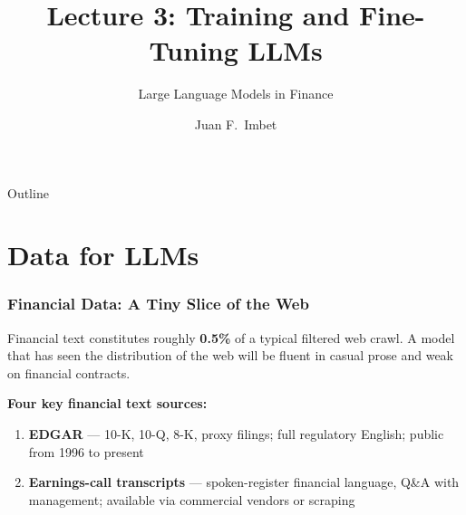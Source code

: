 \documentclass[9pt,t]{beamer}
\title{Lecture 3: Training and Fine-Tuning LLMs}
\subtitle{Large Language Models in Finance}
\author{Juan F.\ Imbet}
\institute{Paris Dauphine -- PSL University}
\date{}
\begin{document}
\begin{frame}
\frametitle{}
\titlepage
\end{frame}

\begin{frame}{Outline}\tableofcontents\end{frame}

\section{Data for LLMs}

\begin{frame}
\frametitle{Financial Data: A Tiny Slice of the Web}

\begin{bigpicture}
  Financial text constitutes roughly \textbf{0.5\%} of a typical filtered web crawl.
  A model that has seen the distribution of the web will be fluent in casual prose
  and weak on financial contracts.
\end{bigpicture}

\medskip
\textbf{Four key financial text sources:}

\begin{enumerate}
  \item \textbf{EDGAR} --- 10-K, 10-Q, 8-K, proxy filings; full regulatory English;
        public from 1996 to present
  \item \textbf{Earnings-call transcripts} --- spoken-register financial language,
        Q\&A with management; available via commercial vendors or scraping
\end{enumerate}
\end{frame}
\end{document}
